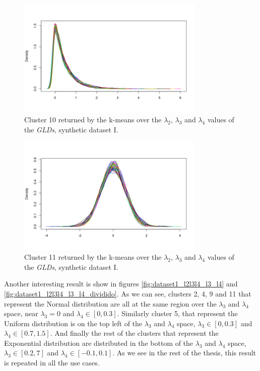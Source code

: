 \begin{figure}[H]
    \centering
    \includegraphics[width=0.8\textwidth]{img/gld_clustering/Dataset1/l2_l3_l4/intento_3/cluster10.png}
    \caption{Cluster 10 returned by the k-means over the $\lambda_{2}$, $\lambda_{3}$ and $\lambda_{4}$ values of the \textit{GLDs}, synthetic dataset I.}
    \label{fig:dataset1_l2l3l4_cl10}
\end{figure}

\begin{figure}[H]
    \centering
    \includegraphics[width=0.8\textwidth]{img/gld_clustering/Dataset1/l2_l3_l4/intento_3/cluster11.png}
    \caption{Cluster 11 returned by the k-means over the $\lambda_{2}$, $\lambda_{3}$ and $\lambda_{4}$ values of the \textit{GLDs}, synthetic dataset I.}
    \label{fig:dataset1_l2l3l4_cl11}
\end{figure}

Another interesting result is show in figures \ref{fig:dataset1_l2l3l4_l3_l4} and \ref{fig:dataset1_l2l3l4_l3_l4_dividido}. As we can see, clusters 2, 4, 9 and 11 that represent the Normal distribution are all at the same region over the $\lambda_{3}$ and $\lambda_{4}$ space, near $\lambda_{3} = 0$ and $\lambda_{4} \in [0, 0.3]$. Similarly cluster 5, that represent the Uniform distribution is on the top left of the $\lambda_{3}$ and $\lambda_{4}$ space, $\lambda_{3} \in [0, 0.3]$ and $\lambda_{4} \in [0.7, 1.5]$. And finally the rest of the clusters that represent the Exponential distribution are distributed in the bottom of the $\lambda_{3}$ and $\lambda_{4}$ space, $\lambda_{3} \in [0.2, 7]$ and $\lambda_{4} \in [-0.1, 0.1]$. As we see in the rest of the thesis, this result is repeated in all the use cases.

